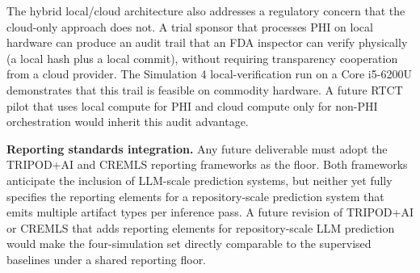 The hybrid local/cloud architecture also addresses a regulatory
concern that the cloud-only approach does not. A trial sponsor that
processes PHI on local hardware can produce an audit trail that an
FDA inspector can verify physically (a local hash plus a local
commit), without requiring transparency cooperation from a cloud
provider. The Simulation 4 local-verification run on a Core i5-6200U
demonstrates that this trail is feasible on commodity hardware. A
future RTCT pilot that uses local compute for PHI and cloud compute
only for non-PHI orchestration would inherit this audit advantage.

\textbf{Reporting standards integration.} Any future deliverable must
adopt the TRIPOD+AI and CREMLS reporting frameworks
\cite{Collins2024TRIPODAI, ElEmam2024CREMLS} as the floor. Both
frameworks anticipate the inclusion of LLM-scale prediction systems,
but neither yet fully specifies the reporting elements for a
repository-scale prediction system that emits multiple artifact types
per inference pass. A future revision of TRIPOD+AI or CREMLS that
adds reporting elements for repository-scale LLM prediction would
make the four-simulation set directly comparable to the supervised
baselines under a shared reporting floor.
